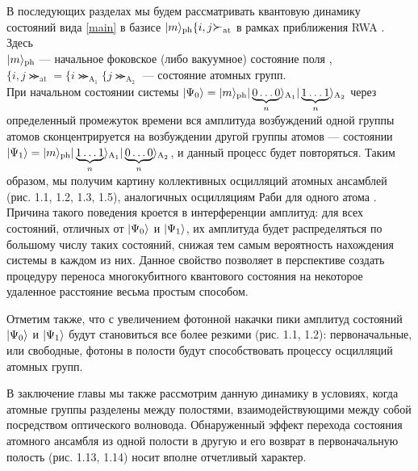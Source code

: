 В последующих разделах мы будем рассматривать квантовую динамику состояний вида \eqref{main} в базисе $|m\ra_{\mathrm{ph}}\{i,j\Succ_{\mathrm{at}}$ в рамках приближения RWA \cite{ozhigov_qq,rwa_rabi_1,rwa_rabi_2}.
\\
\noindent Здесь\\
\indent$|m\rangle_{\mathrm{ph}}$ --- начальное фоковское (либо вакуумное) состояние поля \cite{landau,belousov,messia},
\\[6pt]
\indent$\{i,j\Succ_{\mathrm{at}}\!=\!\{i\Succ_{\mathrm{A_{1}}}\{j\Succ_{\mathrm{A_{2}}}$ --- состояние атомных групп.
\
\\[6pt]
\noindent При начальном состоянии системы $|\Psi_0\rangle=|m\rangle_{\mathrm{ph}}|\protect\underbrace{0\dots0}_{n}\rangle_{\mathrm{A_{1}}} |\protect\underbrace{1\dots1}_{n}\rangle_{\mathrm{A_{2}}}$ через определенный промежуток времени вся амплитуда возбуждений одной группы атомов сконцентрируется на возбуждении другой группы атомов --- состоянии $|\Psi_1\rangle=|m\rangle_{\mathrm{ph}}|\protect\underbrace{1\dots1}_{n}\rangle_{\mathrm{A_{1}}} |\protect\underbrace{0\dots0}_{n}\rangle_{\mathrm{A_{2}}}$, и данный процесс будет повторяться. Таким образом, мы получим картину коллективных осцилляций атомных ансамблей ({\color{red}рис. 1.1, 1.2, 1.3, 1.5}), аналогичных осцилляциям Раби для одного атома \cite{rabi_1,rabi_2,rabi_3}. Причина такого поведения кроется в интерференции амплитуд: для всех состояний, отличных от $|\Psi_{0}\rangle$ и $|\Psi_{1}\rangle$, их амплитуда будет распределяться по большому числу таких состояний, снижая тем самым вероятность нахождения системы в каждом из них. Данное свойство позволяет в перспективе создать процедуру переноса многокубитного квантового состояния на некоторое удаленное расстояние весьма простым способом.

Отметим также, что с увеличением фотонной накачки пики амплитуд состояний $|\Psi_{0}\rangle$ и $|\Psi_{1}\rangle$ будут становиться все более резкими ({\color{red}рис. 1.1, 1.2}): первоначальные, или свободные, фотоны в полости будут способствовать процессу осцилляций атомных групп.

В заключение главы мы также рассмотрим данную динамику в условиях, когда атомные группы разделены между полостями, взаимодействующими между собой посредством оптического волновода. Обнаруженный эффект перехода состояния атомного ансамбля из одной полости в другую и его возврат в первоначальную полость ({\color{red}рис. 1.13, 1.14}) носит вполне отчетливый характер.

\clearpage

